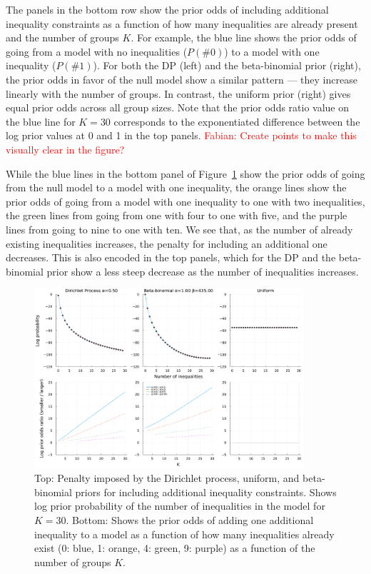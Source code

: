 \documentclass[11pt,a4paper]{article}
\theoremstyle{definition} %
\theoremstyle{case}
\newcommand{\FD}[1]{\textcolor{red}{Fabian: #1 }}
\begin{document}
The panels in the bottom row show the prior odds of including additional inequality constraints as a function of how many inequalities are already present and the number of groups $K$. For example, the blue line shows the prior odds of going from a model with no inequalities ($P(\#0)$) to a model with one inequality ($P(\#1)$). For both the DP (left) and the beta-binomial prior (right), the prior odds in favor of the null model show a similar pattern — they increase linearly with the number of groups. In contrast, the uniform prior (right) gives equal prior odds across all group sizes. Note that the prior odds ratio value on the blue line for $K = 30$ corresponds to the exponentiated difference between the log prior values at 0 and 1 in the top panels. \FD{Create points to make this visually clear in the figure?}

While the blue lines in the bottom panel of Figure~\ref{fig:scott_berger} show the prior odds of going from the null model to a model with one inequality, the orange lines show the prior odds of going from a model with one inequality to one with two inequalities, the green lines from going from one with four to one with five, and the purple lines from going to nine to one with ten. We see that, as the number of already existing inequalities increases, the penalty for including an additional one decreases. This is also encoded in the top panels, which for the DP and the beta-binomial prior show a less steep decrease as the number of inequalities increases.

\begin{figure}
    \centering
    \includegraphics[width=0.89\textwidth]{prior_comparison_plot_2x3_log_scale.pdf}
    \caption{Top: Penalty imposed by the Dirichlet process, uniform, and beta-binomial priors for including additional inequality constraints. Shows log prior probability of the number of inequalities in the model for $K = 30$. Bottom: Shows the prior odds of adding one additional inequality to a model as a function of how many inequalities already exist (0: blue, 1: orange, 4: green, 9: purple) as a function of the number of groups $K$.}
    \label{fig:scott_berger}
\end{figure}
\fi
\end{document}

